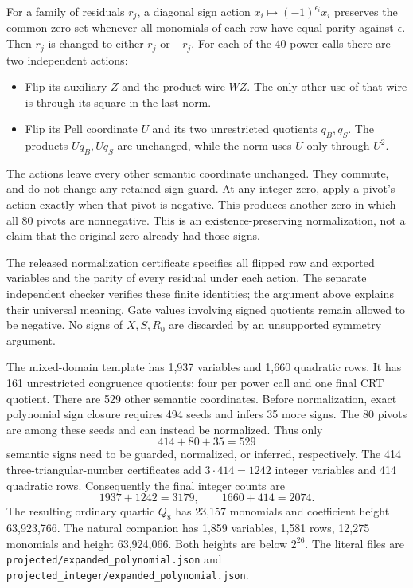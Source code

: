 For a family of residuals $r_j$, a diagonal sign action
$x_i\mapsto(-1)^{\epsilon_i}x_i$ preserves the common zero set whenever
all monomials of each row have equal parity against $\epsilon$.
Then $r_j$ is changed to either $r_j$ or $-r_j$.
For each of the 40 power calls there are two independent actions:
\begin{itemize}
\item Flip its auxiliary $Z$ and the product wire $WZ$.  The only other
      use of that wire is through its square in the last norm.
\item Flip its Pell coordinate $U$ and its two unrestricted quotients
      $q_B,q_S$.  The products $Uq_B,Uq_S$ are unchanged, while the norm
      uses $U$ only through $U^2$.
\end{itemize}
The actions leave every other semantic coordinate unchanged.  They
commute, and do not change any retained sign guard.  At any integer zero,
apply a pivot's action exactly when that pivot is negative.  This produces
another zero in which all 80 pivots are nonnegative.  This is an
existence-preserving normalization, not a claim that the original zero
already had those signs.

The released normalization certificate specifies all flipped raw and
exported variables and the parity of every residual under each action.
The separate independent checker verifies these finite identities; the
argument above explains their universal meaning.  Gate values involving
signed quotients remain allowed to be negative.  No signs of $X,S,R_0$
are discarded by an unsupported symmetry argument.

The mixed-domain template has 1,937 variables and 1,660 quadratic rows.
It has 161 unrestricted congruence quotients: four per power call and
one final CRT quotient.  There are 529 other semantic coordinates.
Before normalization, exact polynomial sign closure requires 494 seeds
and infers 35 more signs.  The 80 pivots are among these seeds and can
instead be normalized.  Thus only
\[
 414+80+35=529
\]
semantic signs need to be guarded, normalized, or inferred, respectively.
The 414 three-triangular-number certificates add $3\cdot414=1242$
integer variables and 414 quadratic rows.  Consequently the final
integer counts are
\[
 1937+1242=3179,\qquad 1660+414=2074.
\]
The resulting ordinary quartic $Q_8$ has 23,157 monomials and coefficient
height 63,923,766.  The natural companion has 1,859 variables, 1,581 rows,
12,275 monomials and height 63,924,066.  Both heights are below $2^{26}$.
The literal files are \texttt{projected/expanded\_polynomial.json} and
\texttt{projected\_integer/expanded\_polynomial.json}.

